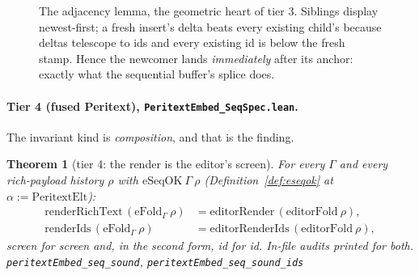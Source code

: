 \documentclass[11pt]{article}
\newtheorem{theorem}{Theorem}[section]
\newcommand{\lean}[1]{\texttt{#1}}
\newcommand{\code}[1]{\texttt{#1}}
\begin{document}
\begin{figure}[h]
\centering
{}
\caption{The adjacency lemma, the geometric heart of tier 3. Siblings
display newest-first; a fresh insert's delta beats every existing
child's because deltas telescope to ids and every existing id is below
the fresh stamp. Hence the newcomer lands \emph{immediately} after its
anchor: exactly what the sequential buffer's splice does.}
\label{fig:adjacency}
\end{figure}

\paragraph{Tier 4 (fused Peritext),
\code{PeritextEmbed\_SeqSpec.lean}.}
The invariant kind is \emph{composition}, and that is the finding.

\begin{theorem}[tier 4: the render is the editor's screen]
\label{thm:peritextseq}
For every $\Gamma$ and every rich-payload history $\rho$ with
$\mathrm{eSeqOK}\ \Gamma\ \rho$ (Definition~\ref{def:eseqok} at
$\alpha := \mathrm{PeritextElt}$):
\[
\begin{aligned}
  \mathrm{renderRichText}\,(\mathrm{eFold}_\Gamma\ \rho)
    &= \mathrm{editorRender}\,(\mathrm{editorFold}\ \rho) , \\
  \mathrm{renderIds}\,(\mathrm{eFold}_\Gamma\ \rho)
    &= \mathrm{editorRenderIds}\,(\mathrm{editorFold}\ \rho) ,
\end{aligned}
\]
screen for screen and, in the second form, id for id. In-file audits
printed for both.
\hfill\lean{peritextEmbed\_seq\_sound},
\lean{peritextEmbed\_seq\_sound\_ids}
\end{theorem}
\end{document}
